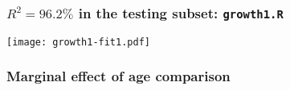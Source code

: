 \documentclass[11pt,dvipsnames,usenames,times]{beamer}
\begin{document}
\begin{comment}
\begin{frame}\frametitle{MCMC Convergence \texttt{fit1\$sigma.}\\
Auto-correlation: {\tt growth0.R}}
\begin{center}
\texttt{[image: growth0-acf.pdf]}
\end{center}
\end{frame}


\begin{frame}\frametitle{MCMC Convergence \texttt{fit1\$sigma}:
\textcolor{red}{$\max \widehat{R}=1.05$} \\
Chains 8: {\tt growth0.R}}
\begin{center}
\texttt{[image: growth0-sigma.pdf]}
\end{center}
\end{frame}
\end{comment}

\begin{frame}\frametitle{$R^2=96.2\%$ in the testing subset: {\tt growth1.R}}
\begin{center}
\texttt{[image: growth1-fit1.pdf]}
\end{center}
\end{frame}

\begin{frame}\frametitle{Marginal effect of age comparison}
\begin{center}
\end{center}
\end{frame}
\end{document}
